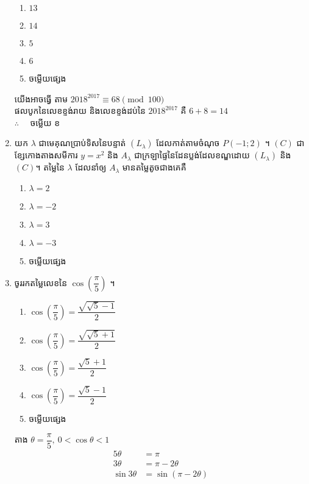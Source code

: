 \documentclass[12pt, a4paper]{article}
\begin{document}
\begin{enumerate}[m]
\begin{enumerate}[k,5]
		\item $13$
		\item $14$
		\item $5$
		\item $6$
		\item ចម្លើយផ្សេង
	\end{enumerate}
	\answer
	\begin{center}
		យើងអាចធ្វើ តាម $2018^{2017}\equiv68 \pmod{100}$\\
		ផលបូកនៃលេខខ្ទង់រាយ និងលេខខ្ទង់ដប់នៃ $2018^{2017}$ គឺ $6+8=14$\\
		$\therefore \quad$ \kml ចម្លើយ \kbk ខ
	\end{center}
	{\color{blue}\hrulefill}
	\item យក $\lambda$ ជាមេគុណប្រាប់ទិសនៃបន្ទាត់ $\left(L_\lambda\right)$ ដែលកាត់តាមចំណុច $P\left(-1;2\right)$ ។ $\left(C\right)$ ជាខ្សែកោងតាងសមីការ $y=x^2$ និង $A_\lambda$ ជាក្រឡាផ្ទៃនៃដែនប្លង់ដែលខណ្ឌដោយ $\left(L_\lambda\right)$ និង $\left(C\right)$។ តម្លៃនៃ $\lambda$ ដែលនាំឲ្យ $A_\lambda$ មានតម្លៃតូចជាងគេគឺ
	\begin{enumerate}[k,5]
		\item $\lambda=2$
		\item $\lambda=-2$
		\item $\lambda=3$
		\item $\lambda=-3$
		\item ចម្លើយផ្សេង
	\end{enumerate}
	\answer
	{\color{blue}\hrulefill}
	\item ចូររកតម្លៃលេខនៃ $\cos\left(\dfrac{\pi}{5}\right)$ ។
	\begin{enumerate}[k,3]
		\item $\cos\left(\dfrac{\pi}{5}\right)=\dfrac{\sqrt{\sqrt{5}-1}}{2}$
		\item $\cos\left(\dfrac{\pi}{5}\right)=\dfrac{\sqrt{\sqrt{5}+1}}{2}$
		\item $\cos\left(\dfrac{\pi}{5}\right)=\dfrac{\sqrt{5}+1}{2}$
		\item $\cos\left(\dfrac{\pi}{5}\right)=\dfrac{\sqrt{5}-1}{2}$
		\item ចម្លើយផ្សេង
	\end{enumerate}
	\answer
	\begin{center}
		តាង $\theta=\dfrac{\pi}{5},~0<\cos\theta<1$
		\begin{align*}
		5\theta &= \pi\\
		3\theta &= \pi -2\theta\\
		\sin3\theta &= \sin\left(\pi-2\theta\right)\\

\end{align*}
\end{center}
\end{enumerate}
\end{document}
